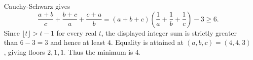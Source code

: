 Cauchy-Schwarz gives
\[
\dfrac{a+b}{c}+\dfrac{b+c}{a}+\dfrac{c+a}{b}
=(a+b+c)\left(\dfrac{1}{a}+\dfrac{1}{b}+\dfrac{1}{c}\right)-3\ge6.
\]
Since $\lfloor t\rfloor>t-1$ for every real $t$, the displayed integer sum is strictly greater than $6-3=3$ and hence at least $4$. Equality is attained at $(a,b,c)=(4,4,3)$, giving floors $2,1,1$. Thus the minimum is $\boxed4$.
